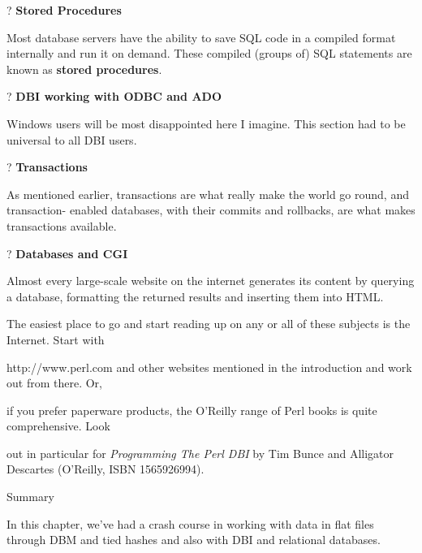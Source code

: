 \documentclass[a4paper,11pt]{book}
\begin{document}
\noindent 

\noindent ? \textbf{Stored Procedures}

\noindent Most  database servers have the  ability  to  save  SQL  code  in  a  compiled  format  internally and  run it on  demand.  These  compiled  (groups  of)  SQL  statements  are known  as  \textbf{stored procedures}.

\noindent 

\noindent ? \textbf{DBI working with ODBC and ADO}

\noindent Windows users will be most disappointed here I imagine. This section had to be universal to all DBI users.

\noindent 

\noindent ? \textbf{Transactions}

\noindent As mentioned earlier, transactions are what really make the world go round, and transaction- enabled databases, with their commits and rollbacks, are what makes transactions available.

\noindent 

\noindent ? \textbf{Databases and CGI}

\noindent Almost every large-scale website on the internet generates its content by querying a database, formatting the returned results and inserting them into HTML.

\noindent 

\noindent The easiest  place to  go  and start  reading  up  on  any  or  all  of  these  subjects  is  the Internet.  Start  with

\noindent http://www.perl.com and other  websites  mentioned  in  the  introduction  and  work out from  there.  Or,

\noindent if  you  prefer paperware products,  the  O'Reilly  range  of Perl  books  is  quite  comprehensive.  Look

\noindent out  in particular for \textit{Programming  The  Perl  DBI  }by  Tim  Bunce  and  Alligator  Descartes  (O'Reilly, ISBN  1565926994).

\noindent 

\noindent 

\noindent Summary

\noindent 

\noindent In  this  chapter,  we've  had a  crash  course  in  working with data in flat files through DBM and tied hashes and also with DBI and relational databases.

\noindent 
\end{document}
